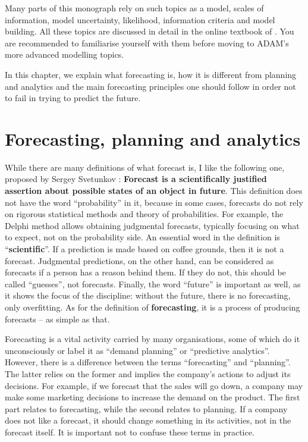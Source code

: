 \documentclass[]{book}
\theoremstyle{definition}
\theoremstyle{definition}
\theoremstyle{definition}
\theoremstyle{definition}
\theoremstyle{remark}
\begin{document}
Many parts of this monograph rely on such topics as a model, scales of information, model uncertainty, likelihood, information criteria and model building. All these topics are discussed in detail in the online textbook of \citet{SvetunkovSBA}. You are recommended to familiarise yourself with them before moving to ADAM's more advanced modelling topics.

In this chapter, we explain what forecasting is, how it is different from planning and analytics and the main forecasting principles one should follow in order not to fail in trying to predict the future.

\hypertarget{forecastingPlanningAnalytics}{%
\section{Forecasting, planning and analytics}\label{forecastingPlanningAnalytics}}

While there are many definitions of what forecast is, I like the following one, proposed by Sergey Svetunkov \citep{Svetunkov2014Textbook}: \textbf{Forecast is a scientifically justified assertion about possible states of an object in future}. This definition does not have the word ``probability'' in it, because in some cases, forecasts do not rely on rigorous statistical methods and theory of probabilities. For example, the Delphi method allows obtaining judgmental forecasts, typically focusing on what to expect, not on the probability side. An essential word in the definition is ``\textbf{scientific}''. If a prediction is made based on coffee grounds, then it is not a forecast. Judgmental predictions, on the other hand, can be considered as forecasts if a person has a reason behind them. If they do not, this should be called ``guesses'', not forecasts. Finally, the word ``future'' is important as well, as it shows the focus of the discipline: without the future, there is no forecasting, only overfitting. As for the definition of \textbf{forecasting}, it is a process of producing forecasts -- as simple as that.

Forecasting is a vital activity carried by many organisations, some of which do it unconsciously or label it as ``demand planning'' or ``predictive analytics''. However, there is a difference between the terms ``forecasting'' and ``planning''. The latter relies on the former and implies the company's actions to adjust its decisions. For example, if we forecast that the sales will go down, a company may make some marketing decisions to increase the demand on the product. The first part relates to forecasting, while the second relates to planning. If a company does not like a forecast, it should change something in its activities, not in the forecast itself. It is important not to confuse these terms in practice.
\end{document}
